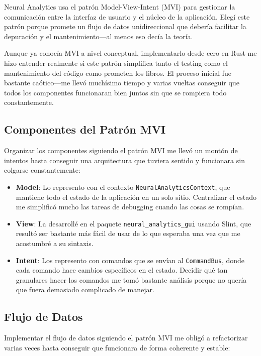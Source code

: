 Neural Analytics usa el patrón Model-View-Intent (MVI) para gestionar la comunicación entre la interfaz de usuario y el núcleo de la aplicación. Elegí este patrón porque promete un flujo de datos unidireccional que debería facilitar la depuración y el mantenimiento—al menos eso decía la teoría.

Aunque ya conocía MVI a nivel conceptual, implementarlo desde cero en Rust me hizo entender realmente si este patrón simplifica tanto el testing como el mantenimiento del código como prometen los libros. El proceso inicial fue bastante caótico—me llevó muchísimo tiempo y varias vueltas conseguir que todos los componentes funcionaran bien juntos sin que se rompiera todo constantemente.

\subsection{Componentes del Patrón MVI}

Organizar los componentes siguiendo el patrón MVI me llevó un montón de intentos hasta conseguir una arquitectura que tuviera sentido y funcionara sin colgarse constantemente:

\begin{itemize}
    \item \textbf{Model}: Lo represento con el contexto \texttt{NeuralAnalyticsContext}, que mantiene todo el estado de la aplicación en un solo sitio. Centralizar el estado me simplificó mucho las tareas de debugging cuando las cosas se rompían.
    \item \textbf{View}: La desarrollé en el paquete \texttt{neural\_analytics\_gui} usando Slint, que resultó ser bastante más fácil de usar de lo que esperaba una vez que me acostumbré a su sintaxis.
    \item \textbf{Intent}: Los represento con comandos que se envían al \texttt{CommandBus}, donde cada comando hace cambios específicos en el estado. Decidir qué tan granulares hacer los comandos me tomó bastante análisis porque no quería que fuera demasiado complicado de manejar.
\end{itemize}

\subsection{Flujo de Datos}

Implementar el flujo de datos siguiendo el patrón MVI me obligó a refactorizar varias veces hasta conseguir que funcionara de forma coherente y estable:

